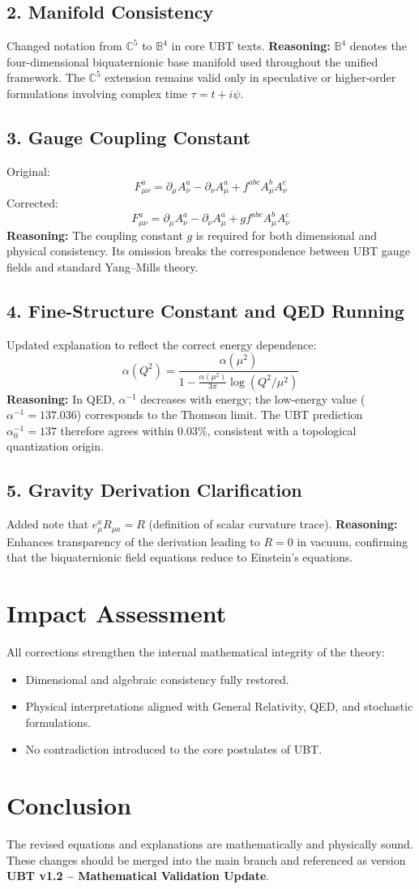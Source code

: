 \documentclass[12pt]{article}
\begin{document}
\subsection*{2. Manifold Consistency}
Changed notation from $\mathbb{C}^5$ to $\mathbb{B}^4$ in core UBT texts.  
\textbf{Reasoning:} $\mathbb{B}^4$ denotes the four-dimensional biquaternionic base manifold used throughout the unified framework.  
The $\mathbb{C}^5$ extension remains valid only in speculative or higher-order formulations involving complex time $\tau = t + i\psi$.

\subsection*{3. Gauge Coupling Constant}
Original:
\[
F^a_{\mu\nu} = \partial_\mu A^a_\nu - \partial_\nu A^a_\mu + f^{abc} A^b_\mu A^c_\nu
\]
Corrected:
\[
F^a_{\mu\nu} = \partial_\mu A^a_\nu - \partial_\nu A^a_\mu + g f^{abc} A^b_\mu A^c_\nu
\]
\textbf{Reasoning:} The coupling constant $g$ is required for both dimensional and physical consistency.  
Its omission breaks the correspondence between UBT gauge fields and standard Yang–Mills theory.

\subsection*{4. Fine-Structure Constant and QED Running}
Updated explanation to reflect the correct energy dependence:
\[
\alpha(Q^2) = \frac{\alpha(\mu^2)}{1 - \frac{\alpha(\mu^2)}{3\pi}\log(Q^2/\mu^2)}
\]
\textbf{Reasoning:} In QED, $\alpha^{-1}$ decreases with energy; the low-energy value ($\alpha^{-1}=137.036$) corresponds to the Thomson limit.  
The UBT prediction $\alpha_0^{-1} = 137$ therefore agrees within $0.03\%$, consistent with a topological quantization origin.

\subsection*{5. Gravity Derivation Clarification}
Added note that $e^a_\mu R_{\mu a} = R$ (definition of scalar curvature trace).  
\textbf{Reasoning:} Enhances transparency of the derivation leading to $R=0$ in vacuum, confirming that the biquaternionic field equations reduce to Einstein’s equations.

\section*{Impact Assessment}
All corrections strengthen the internal mathematical integrity of the theory:
\begin{itemize}
    \item Dimensional and algebraic consistency fully restored.
    \item Physical interpretations aligned with General Relativity, QED, and stochastic formulations.
    \item No contradiction introduced to the core postulates of UBT.
\end{itemize}

\section*{Conclusion}
The revised equations and explanations are mathematically and physically sound.  
These changes should be merged into the main branch and referenced as version \textbf{UBT v1.2 – Mathematical Validation Update}.
\end{document}
